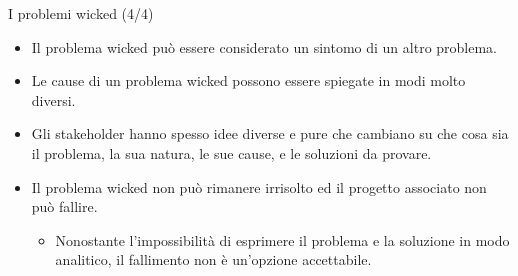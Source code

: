 \documentclass{beamer}
\begin{document}
\begin{frame}{\centerline{I problemi wicked (4/4)}}

\small
\begin{itemize}

\item Il problema wicked pu\`{o} essere considerato un sintomo di un altro problema.

\item Le cause di un problema wicked possono essere spiegate in modi molto diversi.

\item Gli stakeholder hanno spesso idee diverse e pure che cambiano su che cosa sia il problema, la sua natura, le sue cause, e le soluzioni da provare.

\item Il problema wicked non pu\`{o} rimanere irrisolto ed il progetto associato non pu\`{o} fallire.
\begin{itemize}
\item Nonostante l'impossibilit\`{a} di esprimere il problema e la soluzione in modo analitico, il fallimento non \`{e} un'opzione accettabile.
\end{itemize}

\end{itemize}

\end{frame}
\end{document}
